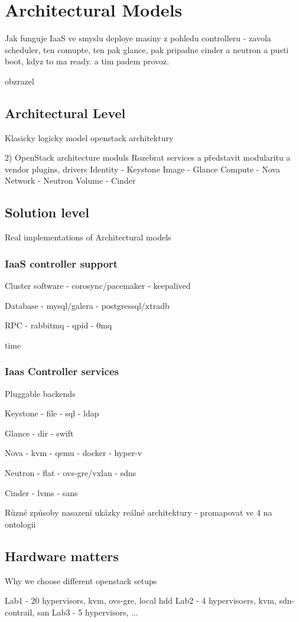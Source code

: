 
\section{Architectural Models}

Jak funguje IaaS ve smyslu deploye masiny z pohledu controlleru - zavola scheduler, ten comupte, ten pak glance, pak pripadne cinder a neutron a pusti boot, kdyz to ma ready. a tim padem provoz.

obzrazel


\subsection{Architectural Level}

Klasicky logicky model openstack architektury

2) OpenStack architecture moduls
Rozebrat services a představit modularitu a vendor plugins, drivers
Identity - Keystone
Image - Glance
Compute - Nova
Network - Neutron
Volume - Cinder

\subsection{Solution level}

Real implementations of Architectural models

\subsubsection{IaaS controller support }

Cluster software
- corosync/pacemaker
- keepalived

Database
- mysql/galera
- postgressql/xtradb

RPC
- rabbitmq
- qpid
- 0mq

time

\subsubsection{Iaas Controller services}

Pluggable backends

Keystone
- file
- sql
- ldap

Glance
- dir
- swift

Nova
- kvm
- qemu
- docker
- hyper-v

Neutron
- flat
- ovs-gre/vxlan
- sdns

Cinder
- lvms
- sans


Různé způsoby nasazení ukázky reálné architektury - promapovat ve 4 na ontologii

\subsection{Hardware matters}

Why we choose different openstack setups

Lab1 - 20 hypervisors, kvm, ovs-gre, local hdd
Lab2 - 4 hypervisoers, kvm, sdn-contrail, san
Lab3 - 5 hypervisors, ...


